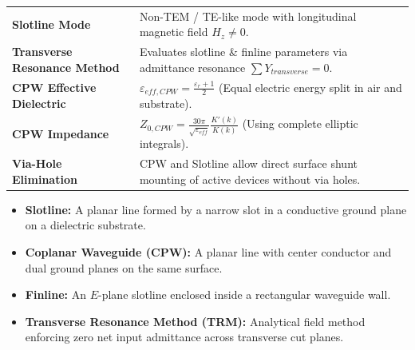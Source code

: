 \documentclass[10pt,a4paper]{article}
\begin{document}
\begin{tcolorbox}[formulabox, title={\textbf{Key Concepts and Metrics at a Glance}}]
\renewcommand{\arraystretch}{1.35}
\begin{tabularx}{\linewidth}{>{\raggedright\arraybackslash\bfseries}p{4.5cm} X}
Slotline Mode & Non-TEM / TE-like mode with longitudinal magnetic field $H_z \ne 0$. \\[4pt]
Transverse Resonance Method & Evaluates slotline \& finline parameters via admittance resonance $\sum Y_{transverse} = 0$. \\[4pt]
CPW Effective Dielectric & $\varepsilon_{eff,CPW} = \frac{\varepsilon_r+1}{2}$ \quad (Equal electric energy split in air and substrate). \\[4pt]
CPW Impedance & $Z_{0,CPW} = \frac{30\pi}{\sqrt{\varepsilon_{eff}}} \frac{K'(k)}{K(k)}$ \quad (Using complete elliptic integrals). \\[4pt]
Via-Hole Elimination & CPW and Slotline allow direct surface shunt mounting of active devices without via holes. \\
\end{tabularx}
\end{tcolorbox}

\begin{tcolorbox}[defbox, title={\textbf{One-Line Definitions}}]
  \begin{itemize}[leftmargin=*, noitemsep]
    \item \textbf{Slotline:} A planar line formed by a narrow slot in a conductive ground plane on a dielectric substrate.
    \item \textbf{Coplanar Waveguide (CPW):} A planar line with center conductor and dual ground planes on the same surface.
    \item \textbf{Finline:} An $E$-plane slotline enclosed inside a rectangular waveguide wall.
    \item \textbf{Transverse Resonance Method (TRM):} Analytical field method enforcing zero net input admittance across transverse cut planes.
  \end{itemize}
\end{tcolorbox}
\end{document}
